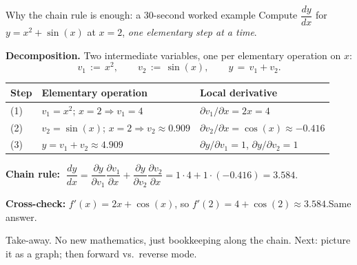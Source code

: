 \documentclass[aspectratio=169,11pt]{beamer}
\newcommand{\emphc}[1]{\textcolor{harvardcrimson}{#1}}
\begin{document}
\begin{frame}{Why the chain rule is enough: a 30-second worked example}
\scriptsize
Compute $\dfrac{dy}{dx}$ for $y = x^2 + \sin(x)$ at $x=2$, \emph{one elementary step at a time}.

\vspace{2pt}
\textbf{Decomposition.}  Two intermediate variables, one per elementary operation on $x$:
\[
v_1 \,:=\, x^2, \qquad v_2 \,:=\, \sin(x), \qquad y \,=\, v_1 + v_2.
\]

\vspace{2pt}
\begin{tabular}{@{}p{1.0cm}p{5.6cm}p{5.0cm}@{}}
\toprule
\textbf{Step} & \textbf{Elementary operation} & \textbf{Local derivative} \\
\midrule
\textcolor{harvardcrimson}{(1)} & $v_1 = x^2$;\; $x=2 \Rightarrow v_1 = 4$ & $\partial v_1/\partial x = 2x = 4$ \\
\textcolor{harvardcrimson}{(2)} & $v_2 = \sin(x)$;\; $x=2 \Rightarrow v_2 \approx 0.909$ & $\partial v_2/\partial x = \cos(x) \approx -0.416$ \\
\textcolor{harvardcrimson}{(3)} & $y = v_1 + v_2 \approx 4.909$ & $\partial y / \partial v_1 = 1$, \; $\partial y / \partial v_2 = 1$ \\
\bottomrule
\end{tabular}

\vspace{3pt}
\textbf{Chain rule:} $\;\dfrac{dy}{dx} = \dfrac{\partial y}{\partial v_1}\dfrac{\partial v_1}{\partial x} + \dfrac{\partial y}{\partial v_2}\dfrac{\partial v_2}{\partial x} = 1\cdot 4 + 1\cdot (-0.416) = 3.584.$

\textbf{Cross-check:} $f'(x) = 2x + \cos(x)$, so $f'(2) = 4 + \cos(2) \approx 3.584$.\;\emphc{Same answer.}

\vspace{2pt}
\emphc{Take-away.} No new mathematics, just bookkeeping along the chain.  Next: picture it as a graph; then forward vs.\ reverse mode.
\end{frame}
\end{document}
